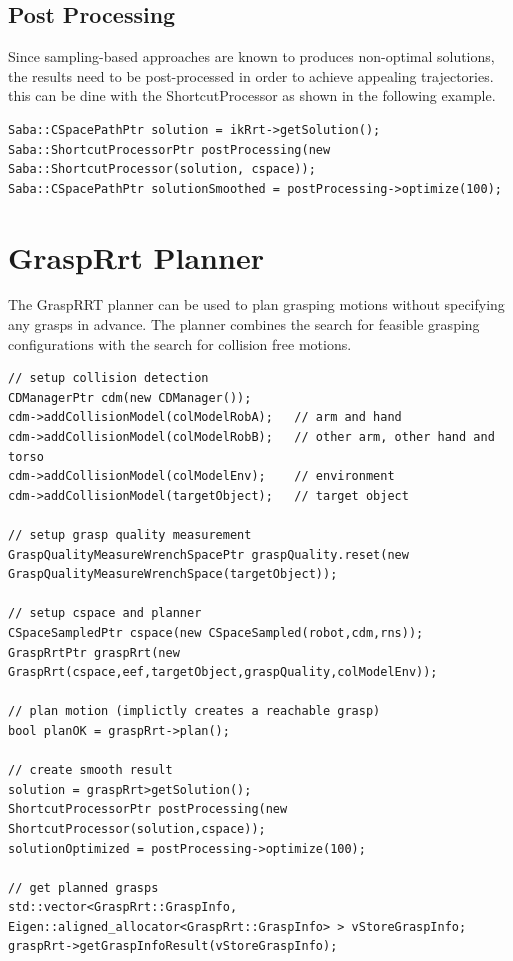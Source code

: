 \documentclass{book}
\begin{document}
\subsection{Post Processing}
Since sampling-based approaches are known to produces non-optimal solutions, the results need to be post-processed in order to achieve appealing trajectories. this can be dine with the ShortcutProcessor as shown in the following example.   
\begin{lstlisting}
Saba::CSpacePathPtr solution = ikRrt->getSolution();
Saba::ShortcutProcessorPtr postProcessing(new Saba::ShortcutProcessor(solution, cspace));
Saba::CSpacePathPtr solutionSmoothed = postProcessing->optimize(100);
\end{lstlisting}
\section{GraspRrt Planner}
The GraspRRT planner can be used to plan grasping motions without specifying any grasps in advance. The planner combines the search for feasible grasping configurations with the search for collision free motions. 
\begin{lstlisting}
// setup collision detection
CDManagerPtr cdm(new CDManager());
cdm->addCollisionModel(colModelRobA);   // arm and hand
cdm->addCollisionModel(colModelRobB);   // other arm, other hand and torso
cdm->addCollisionModel(colModelEnv);    // environment
cdm->addCollisionModel(targetObject);   // target object

// setup grasp quality measurement
GraspQualityMeasureWrenchSpacePtr graspQuality.reset(new GraspQualityMeasureWrenchSpace(targetObject));

// setup cspace and planner
CSpaceSampledPtr cspace(new CSpaceSampled(robot,cdm,rns));
GraspRrtPtr graspRrt(new GraspRrt(cspace,eef,targetObject,graspQuality,colModelEnv));

// plan motion (implictly creates a reachable grasp)
bool planOK = graspRrt->plan();

// create smooth result
solution = graspRrt>getSolution();
ShortcutProcessorPtr postProcessing(new ShortcutProcessor(solution,cspace));
solutionOptimized = postProcessing->optimize(100);

// get planned grasps
std::vector<GraspRrt::GraspInfo, Eigen::aligned_allocator<GraspRrt::GraspInfo> > vStoreGraspInfo;
graspRrt->getGraspInfoResult(vStoreGraspInfo);
\end{lstlisting}
\end{document}
